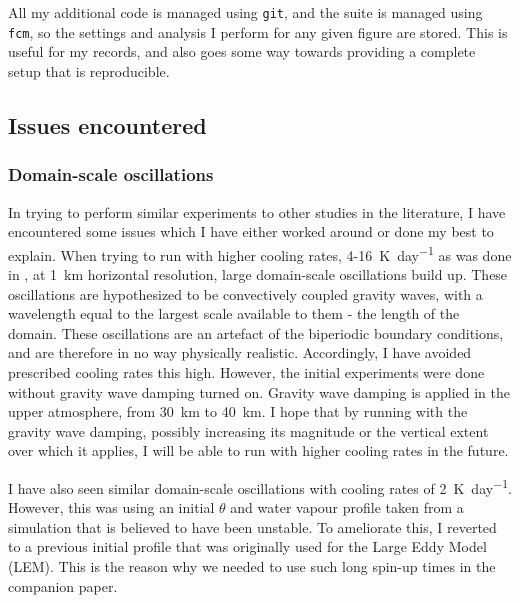 \documentclass[11pt,a4paper]{article}
\begin{document}
All my additional code is managed using \texttt{git}, and the suite is managed using \texttt{fcm}, so the settings and analysis I perform for any given figure are stored. This is useful for my records, and also goes some way towards providing a complete setup that is reproducible.




\subsection{Issues encountered}
\label{sec:issues}

\subsubsection{Domain-scale oscillations}
\label{sec:osc}
In trying to perform similar experiments to other studies in the literature, I have encountered some issues which I have either worked around or done my best to explain. When trying to run with higher cooling rates, \SI{4}{}-\SI{16}{K.day^{-1}} as was done in \cite{cohen2006fluctuations}, at \SI{1}{km} horizontal resolution, large domain-scale oscillations build up. These oscillations are hypothesized to be convectively coupled gravity waves, with a wavelength equal to the largest scale available to them - the length of the domain. These oscillations are an artefact of the biperiodic boundary conditions, and are therefore in no way physically realistic. Accordingly, I have avoided prescribed cooling rates this high. However, the initial experiments were done without gravity wave damping turned on. Gravity wave damping is applied in the upper atmosphere, from \SI{30}{km} to \SI{40}{km}. I hope that by running with the gravity wave damping, possibly increasing its magnitude or the vertical extent over which it applies, I will be able to run with higher cooling rates in the future.

I have also seen similar domain-scale oscillations with cooling rates of \SI{2}{K.day^{-1}}. However, this was using an initial $\theta$ and water vapour profile taken from a simulation that is believed to have been unstable. To ameliorate this, I reverted to a previous initial profile that was originally used for the Large Eddy Model (LEM). This is the reason why we needed to use such long spin-up times in the companion paper.
\end{document}
